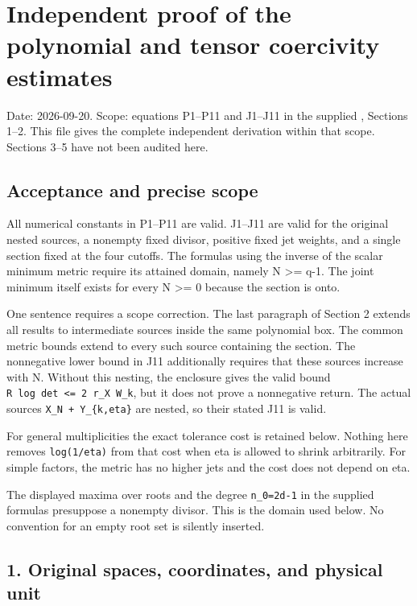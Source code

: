 \documentclass[11pt]{article}
\begin{document}
\section{Independent proof of the polynomial and tensor coercivity estimates}\label{independent-proof-of-the-polynomial-and-tensor-coercivity-estimates}

Date: 2026-09-20. Scope: equations P1--P11 and J1--J11 in the supplied , Sections 1--2. This file gives the complete independent derivation within that scope. Sections 3--5 have not been audited here.

\subsection{Acceptance and precise scope}\label{acceptance-and-precise-scope}

All numerical constants in P1--P11 are valid. J1--J11 are valid for the original nested sources, a nonempty fixed divisor, positive fixed jet weights, and a single section fixed at the four cutoffs. The formulas using the inverse of the scalar minimum metric require its attained domain, namely N \textgreater= q-1. The joint minimum itself exists for every N \textgreater= 0 because the section is onto.

One sentence requires a scope correction. The last paragraph of Section 2 extends all results to intermediate sources inside the same polynomial box. The common metric bounds extend to every such source containing the section. The nonnegative lower bound in J11 additionally requires that these sources increase with N. Without this nesting, the enclosure gives the valid bound \texttt{\textbar{}R\ log\ det\textbar{}\ \textless{}=\ 2\ r\_X\ W\_k}, but it does not prove a nonnegative return. The actual sources \texttt{X\_N\ +\ Y\_\{k,eta\}} are nested, so their stated J11 is valid.

For general multiplicities the exact tolerance cost is retained below. Nothing here removes \texttt{log(1/eta)} from that cost when eta is allowed to shrink arbitrarily. For simple factors, the metric has no higher jets and the cost does not depend on eta.

The displayed maxima over roots and the degree \texttt{n\_0=2d-1} in the supplied formulas presuppose a nonempty divisor. This is the domain used below. No convention for an empty root set is silently inserted.

\subsection{1. Original spaces, coordinates, and physical unit}\label{original-spaces-coordinates-and-physical-unit}
\end{document}

